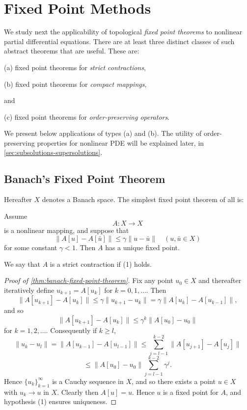 \section{Fixed Point Methods}
\label{sec:fixed-point-methods}

We study next the applicability of topological \textit{fixed point theorems} to nonlinear partial differential equations. There are at least three distinct classes of such abstract theorems that are useful. These are:

\noindent (a) fixed point theorems for \textit{strict contractions},

\noindent (b) fixed point theorems for \textit{compact mappings},

\noindent and

\noindent (c) fixed point theorems for \textit{order-preserving operators}.

We present below applications of types (a) and (b). The utility of order-preserving properties for nonlinear PDE will be explained later, in \cref{sec:subsolutions-supersolutions}.

\subsection{Banach's Fixed Point Theorem}
\label{sec:banachs-fixed-point-theorem}

Hereafter $X$ denotes a Banach space. The simplest fixed point theorem of all is:

\begin{theorem}
\label{thm:banach-fixed-point-theorem}
Assume
\[
A : X \to X
\]
is a nonlinear mapping, and suppose that
\[
\|A[u] - A[\bar{u}]\| \leq \gamma \|u - \bar{u}\| \quad (u, \bar{u} \in X)
\tag{1}
\]
for some constant $\gamma < 1$. Then $A$ has a unique fixed point.
\end{theorem}

\begin{definition}
\label{def:strict-contraction}
We say that $A$ is a strict contraction if (1) holds.
\end{definition}

\begin{proof}[Proof of \cref{thm:banach-fixed-point-theorem}]
Fix any point $u_0 \in X$ and thereafter iteratively define $u_{k+1} = A[u_k]$ for $k = 0, 1, \ldots$. Then
\[
\|A[u_{k+1}] - A[u_k]\| \le \gamma \|u_{k+1} - u_k\| = \gamma \|A[u_k] - A[u_{k-1}]\|,
\]
and so
\[
\|A[u_{k+1}] - A[u_k]\| \le \gamma^k \|A[u_0] - u_0\|
\]
for $k = 1, 2, \ldots$. Consequently if $k \ge l$,
\[
\|u_k - u_l\| = \|A[u_{k-1}] - A[u_{l-1}]\| \le \sum_{j=l-1}^{k-2} \|A[u_{j+1}] - A[u_j]\|
\]
\[
\le \|A[u_0] - u_0\| \sum_{j=l-1}^{k-2} \gamma^j.
\]
Hence $\{u_k\}_{k=1}^{\infty}$ is a Cauchy sequence in $X$, and so there exists a point $u \in X$ with $u_k \to u$ in $X$. Clearly then $A[u] = u$. Hence $u$ is a fixed point for $A$, and hypothesis (1) ensures uniqueness.
\end{proof}

